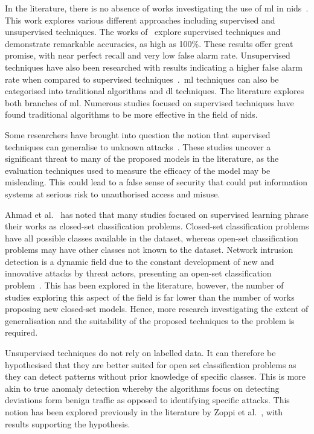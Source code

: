 In the literature, there is no absence of works investigating the use of
\gls{ml} in \gls{nids}~\cite{Karatas, Jiang, Mighan, Pu, Cao, Zoppi, Atefinia}.
This work explores various different approaches including supervised and
unsupervised techniques. The works of~\cite{Karatas, Jiang, Mighan, Atefinia}
explore supervised techniques and demonstrate remarkable accuracies, as high as
100\%. These results offer great promise, with near perfect recall and very low
false alarm rate. Unsupervised techniques have also been researched with
results indicating a higher false alarm rate when compared to supervised
techniques~\cite{}.\ \gls{ml} techniques can also be categorised into
traditional algorithms and \gls{dl} techniques. The literature explores both
branches of \gls{ml}. Numerous studies focused on supervised techniques have
found traditional algorithms to be more effective in the field of \gls{nids}. %

Some researchers have brought into question the notion that supervised
techniques can generalise to unknown attacks~\cite{Kus, Zoppi}. These studies
uncover a significant threat to many of the proposed models in the literature,
as the evaluation techniques used to measure the efficacy of the model may be
misleading. This could lead to a false sense of security that could put
information systems at serious risk to unauthorised access and misuse.

Ahmad et al.~\cite{zero-day} has noted that many studies focused on supervised
learning phrase their works as closed-set classification problems. Closed-set
classification problems have all possible classes available in the dataset,
whereas open-set classification problems may have other classes not known to
the dataset. Network intrusion detection is a dynamic field due to the constant
development of new and innovative attacks by threat actors, presenting an
open-set classification problem~\cite{}. This has been explored in the
literature, however, the number of studies exploring this aspect of the field
is far lower than the number of works proposing new closed-set models. Hence,
more research investigating the extent of generalisation and the suitability of
the proposed techniques to the problem is required.%

Unsupervised techniques do not rely on labelled data. It can therefore be
hypothesised that they are better suited for open set classification problems
as they can detect patterns without prior knowledge of specific classes. This
is more akin to true anomaly detection whereby the algorithms focus on
detecting deviations form benign traffic as opposed to identifying specific
attacks. This notion has been explored previously in the literature by Zoppi et
al.~\cite{Zoppi}, with results supporting the hypothesis.

